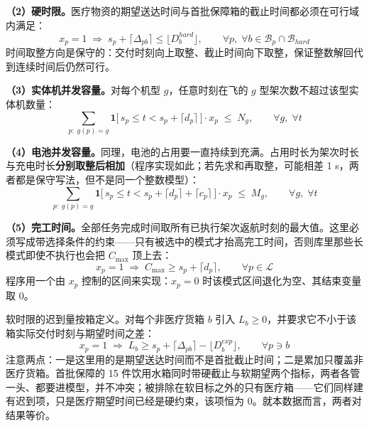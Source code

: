 \documentclass[withoutpreface,bwprint]{format}
\begin{document}
\textbf{（2）硬时限。}医疗物资的期望送达时间与首批保障箱的截止时间都必须在可行域内满足：
\begin{equation}
x_p = 1 \;\Longrightarrow\; s_p + \lceil \Delta_{pb} \rceil \le \lfloor D_b^{hard} \rfloor, \qquad \forall p,\; \forall b \in \mathcal{B}_p \cap \mathcal{B}_{hard}
\end{equation}
时间取整方向是保守的：交付时刻向上取整、截止时间向下取整，保证整数解回代到连续时间后仍然可行。

\textbf{（3）实体机并发容量。}对每个机型 $g$，任意时刻在飞的 $g$ 型架次数不超过该型实体机数量：
\begin{equation}
\sum_{p:\; g(p) = g} \mathbf{1}\bigl[\,s_p \le t < s_p + \lceil d_p \rceil\,\bigr] \cdot x_p \;\le\; N_g, \qquad \forall g,\; \forall t
\end{equation}

\textbf{（4）电池并发容量。}同理，电池的占用要一直持续到充满。占用时长为架次时长与充电时长\textbf{分别取整后相加}（程序实现如此；若先求和再取整，可能相差 1 s，两者都是保守写法，但不是同一个整数模型）：
\begin{equation}
\sum_{p:\; g(p) = g} \mathbf{1}\bigl[\,s_p \le t < s_p + \lceil d_p \rceil + \lceil c_p \rceil\,\bigr] \cdot x_p \;\le\; M_g, \qquad \forall g,\; \forall t
\end{equation}

\textbf{（5）完工时间。}全部任务完成时间取所有已执行架次返航时刻的最大值。这里必须写成带选择条件的约束——只有被选中的模式才抬高完工时间，否则库里那些长模式即使不执行也会把 $C_{\max}$ 顶上去：
\begin{equation}
x_p = 1 \;\Longrightarrow\; C_{\max} \ge s_p + \lceil d_p \rceil, \qquad \forall p \in \mathcal{L}
\end{equation}
程序用一个由 $x_p$ 控制的区间来实现：$x_p = 0$ 时该模式区间退化为空、其结束变量取 0。

软时限的迟到量按箱定义。对每个非医疗货箱 $b$ 引入 $L_b \ge 0$，并要求它不小于该箱实际交付时刻与期望时间之差：
\begin{equation}
x_p = 1 \;\Longrightarrow\; L_b \ge s_p + \lceil \Delta_{pb} \rceil - \lfloor D_b^{exp} \rfloor, \qquad \forall p \ni b
\end{equation}
注意两点：一是这里用的是期望送达时间而不是首批截止时间；二是累加只覆盖非医疗货箱。首批保障的 15 件饮用水箱同时带硬截止与软期望两个指标，两者各管一头、都要进模型，并不冲突；被排除在软目标之外的只有医疗箱——它们同样建有迟到项，只是医疗期望时间已经是硬约束，该项恒为 0。就本数据而言，两者对结果等价。
\end{document}
